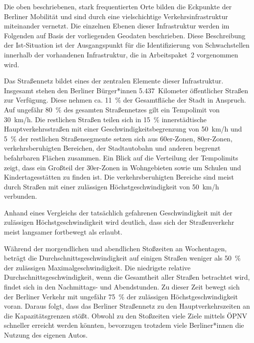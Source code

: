 Die oben beschriebenen, stark frequentierten Orte bilden die Eckpunkte der Berliner Mobilität und sind durch eine vielschichtige Verkehrsinfrastruktur miteinander vernetzt. Die einzelnen Ebenen dieser Infrastruktur werden im Folgenden auf Basis der vorliegenden Geodaten beschrieben. Diese Beschreibung der Ist-Situation ist der Ausgangspunkt für die Identifizierung von Schwachstellen innerhalb der vorhandenen Infrastruktur, die in Arbeitspaket~2 vorgenommen wird.

Das Straßennetz bildet eines der zentralen Elemente dieser Infrastruktur. Insgesamt stehen den Berliner Bürger*innen 5.437~Kilometer öffentlicher Straßen zur Verfügung. Diese nehmen ca. 11~\% der Gesamtfläche der Stadt in Anspruch. Auf ungefähr 80~\% des gesamten Straßennetzes gilt ein Tempolimit von 30~km/h. Die restlichen Straßen teilen sich in 15~\% innerstädtische Hauptverkehrsstraßen mit einer Geschwindigkeitsbegrenzung von 50~km/h und 5~\% der restlichen Straßensegmente setzen sich aus 60er-Zonen, 80er-Zonen, verkehrsberuhigten Bereichen, der Stadtautobahn und anderen begrenzt befahrbaren Flächen zusammen. Ein Blick auf die Verteilung der Tempolimits zeigt, dass ein Großteil der 30er-Zonen in Wohngebieten sowie um Schulen und Kindertagesstätten zu finden ist. Die verkehrsberuhigten Bereiche sind meist durch Straßen mit einer zulässigen Höchstgeschwindigkeit von 50~km/h verbunden.


Anhand eines Vergleichs der tatsächlich gefahrenen Geschwindigkeit mit der zulässigen Höchstgeschwindigkeit wird deutlich, dass sich der Straßenverkehr meist langsamer fortbewegt als erlaubt.


Während der morgendlichen und abendlichen Stoßzeiten an Wochentagen, beträgt die Durchschnittsgeschwindigkeit auf einigen Straßen weniger als 50~\% der zulässigen Maximalgeschwindigkeit. Die niedrigste relative Durchschnittsgeschwindigkeit, wenn die Gesamtheit aller Straßen betrachtet wird, findet sich in den Nachmittags- und Abendstunden. Zu dieser Zeit bewegt sich der Berliner Verkehr mit ungefähr 75~\% der zulässigen Höchstgeschwindigkeit voran. Daraus folgt, dass das Berliner Straßennetz zu den Hauptverkehrszeiten an die Kapazitätsgrenzen stößt. Obwohl zu den Stoßzeiten viele Ziele mittels ÖPNV schneller erreicht werden könnten, bevorzugen trotzdem viele Berliner*innen die Nutzung des eigenen Autos.

